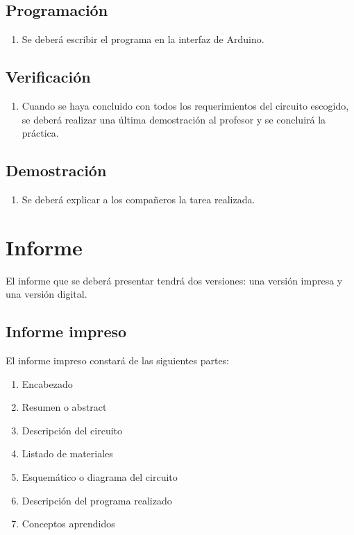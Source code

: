 \documentclass[12pt,letterpaper]{IEEEtran}
\begin{document}
\subsection{Programación}

\begin{enumerate}[resume]
	\item Se deberá escribir el programa en la interfaz de Arduino.
\end{enumerate}

\subsection{Verificación}

\begin{enumerate}[resume]
	\item Cuando se haya concluido con todos los requerimientos del circuito escogido, se deberá realizar una última demostración al profesor y se concluirá la práctica.
\end{enumerate}

\subsection{Demostración}

\begin{enumerate}[resume]
	\item Se deberá explicar a los compañeros la tarea realizada.
\end{enumerate}

\section{Informe}

El informe que se deberá presentar tendrá dos versiones: una versión impresa y una versión digital.

\subsection{Informe impreso}

El informe impreso constará de las siguientes partes:

\begin{enumerate}
  \item Encabezado
  \item Resumen o abstract
  \item Descripción del circuito
  \item Listado de materiales
  \item Esquemático o diagrama del circuito
  \item Descripción del programa realizado
  \item Conceptos aprendidos
\end{enumerate}
\end{document}
